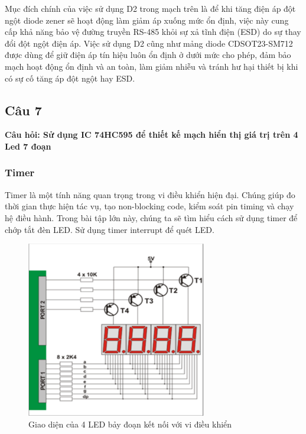 Mục đích chính của việc sử dụng D2 trong mạch trên là để khi tăng điện áp đột ngột diode zener sẽ hoạt động làm giảm áp xuống mức ổn định, việc này cung cấp khả năng bảo vệ đường truyền RS-485 khỏi sự xả tĩnh điện (ESD) do sự thay đổi đột ngột điện áp. Việc sử dụng D2 cũng như mảng diode CDSOT23-SM712 được dùng để giữ điện áp tín hiệu luôn ổn định ở dưới mức cho phép, đảm bảo mạch hoạt động ổn định và an toàn, làm giảm nhiễu và tránh hư hại thiết bị khi có sự cố tăng áp đột ngột hay ESD.
\pagebreak
\subsection{Câu 7}
\textbf{Câu hỏi: Sử dụng IC 74HC595 để thiết kế mạch hiển thị giá trị trên 4 Led 7 đoạn}
\subsubsection{Timer}
Timer là một tính năng quan trọng trong vi điều khiển hiện đại. Chúng giúp đo thời gian thực hiện tác vụ, tạo non-blocking code, kiểm soát pin timing và chạy hệ điều hành. Trong bài tập lớn này, chúng ta sẽ tìm hiểu cách sử dụng timer để chớp tắt đèn LED. Sử dụng timer interrupt để quét LED.
\begin{figure}[ht]
    \centering
    \includegraphics[width=0.7\textwidth]{graphics/LED_7seg.PNG}
    \caption{Giao diện của 4 LED bảy đoạn kết nối với vi điều khiển}
\end{figure}

